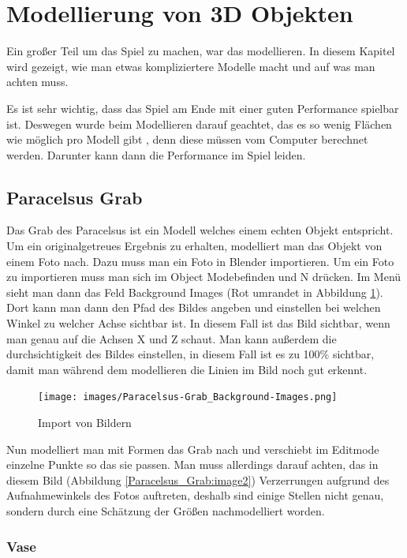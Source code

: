 \section{Modellierung von 3D Objekten}
Ein großer Teil um das Spiel zu machen, war das modellieren. In diesem Kapitel wird gezeigt, wie man etwas kompliziertere
Modelle macht und auf was man achten muss.

Es ist sehr wichtig, dass das Spiel am Ende mit einer guten Performance spielbar ist. Deswegen wurde beim Modellieren darauf geachtet,
das es so wenig Flächen wie möglich pro Modell gibt \citep{unreal:modellierungVon3dObjekten_performance}, denn diese müssen vom Computer berechnet werden.
Darunter kann dann die Performance im Spiel leiden.

\label{sec:Modellierung_von_3D_Objekten}
\subsection{Paracelsus Grab}
Das Grab des Paracelsus ist ein Modell welches einem echten Objekt entspricht. Um ein originalgetreues Ergebnis zu erhalten,
modelliert man das Objekt von einem Foto nach. Dazu muss man ein Foto in Blender importieren. Um ein Foto zu importieren muss man sich im \dq Object Mode\dq befinden und \dq N\dq
drücken. Im Menü sieht man dann das Feld Background Images (Rot umrandet in Abbildung \ref{Paracelsus_Grab:image1}). Dort kann man dann den Pfad des Bildes angeben
und einstellen bei welchen Winkel zu welcher Achse sichtbar ist. In diesem Fall ist das Bild sichtbar, wenn man genau auf die Achsen X und Z schaut. Man kann außerdem die
durchsichtigkeit des Bildes einstellen, in diesem Fall ist es zu 100\% sichtbar, damit man während dem modellieren die Linien im Bild noch gut erkennt.

\begin{figure}[h]
    \centering
    \texttt{[image: images/Paracelsus-Grab\_Background-Images.png]}
    \caption{Import von Bildern}
    \label{Paracelsus_Grab:image1}
\end{figure}

Nun modelliert man mit Formen das Grab nach und verschiebt im Editmode einzelne Punkte so das sie passen. Man muss allerdings darauf achten, das in diesem Bild
(Abbildung \ref{Paracelsus_Grab:image2}) Verzerrungen aufgrund des Aufnahmewinkels des Fotos auftreten, deshalb sind einige Stellen nicht genau, sondern
durch eine Schätzung der Größen nachmodelliert worden.

\subsubsection{Vase}
